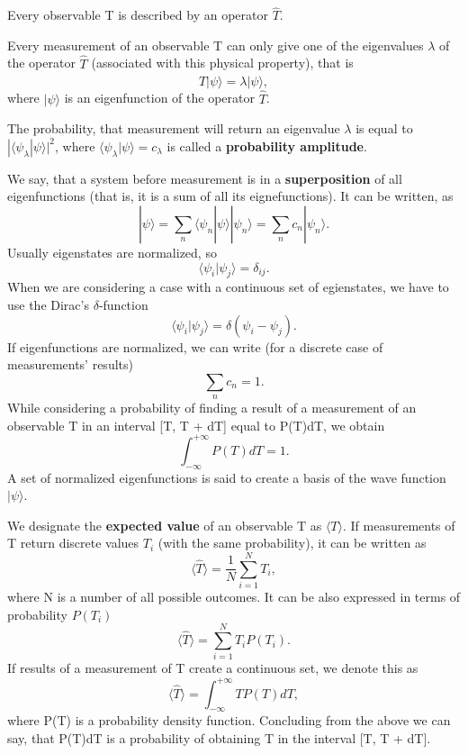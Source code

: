\begin{postulate}
Every observable T is described by an operator $\hat{T}$. 
\end{postulate}

\begin{postulate}
Every measurement of an observable T can only give one of the eigenvalues $\lambda$ of the operator $\hat{T}$ (associated with this physical property), that is
\[ \hat{T} |\psi\rangle = \lambda |\psi \rangle,  \]
where $|\psi \rangle$ is an eigenfunction of the operator $\hat{T}$.
\end{postulate}

\begin{postulate}
The probability, that measurement will return an eigenvalue $\lambda$ is equal to $| \langle \psi_\lambda | \psi \rangle |^2$, where $\langle \psi_\lambda | \psi \rangle = c_\lambda$ is called a \textbf{probability amplitude}.
\end{postulate}

\begin{remark}
We say, that a system before measurement is in a \textbf{superposition} of all eigenfunctions (that is, it is a sum of all its eignefunctions). It can be written, as
\[ | \psi \rangle = \sum_n \langle \psi_n | \psi \rangle |\psi_n \rangle = \sum_n c_n | \psi_n \rangle. \]
Usually eigenstates are normalized, so
\[ \langle \psi_i | \psi_j \rangle = \delta_{ij}. \]
When we are considering a case with a continuous set of egienstates, we have to use the Dirac's $\delta$-function
\[ \langle \psi_i | \psi_j \rangle = \delta(\psi_i - \psi_j). \]
If eigenfunctions are normalized, we can write (for a discrete case of measurements' results)
\[ \sum_n c_n = 1. \]
While considering a probability of finding a result of a measurement of an observable T in an interval [T, T + dT] equal to P(T)dT, we obtain
\[ \int_{-\infty}^{+\infty} P(T)dT = 1. \]
A set of normalized eigenfunctions is said to create a basis of the wave function $| \psi \rangle$.
\end{remark}

\begin{definition}
We designate the \textbf{expected value} of an observable T as $\langle T \rangle$. If measurements of T return discrete values $T_i$ (with the same probability), it can be written as
\[  \langle \hat{T} \rangle = \frac{1}{N} \sum_{i = 1}^N T_i,\]
where N is a number of all possible outcomes. It can be also expressed in terms of probability $P(T_i)$
\[ \langle \hat{T} \rangle = \sum_{i=1}^N T_i P(T_i). \]
If results of a measurement of T create a continuous set, we denote this as
\[ \langle \hat{T} \rangle = \int_{-\infty}^{+\infty} T P(T) dT, \]
where P(T) is a probability density function. Concluding from the above we can say, that P(T)dT is a probability of obtaining T in the interval [T, T + dT]. 
\end{definition}

